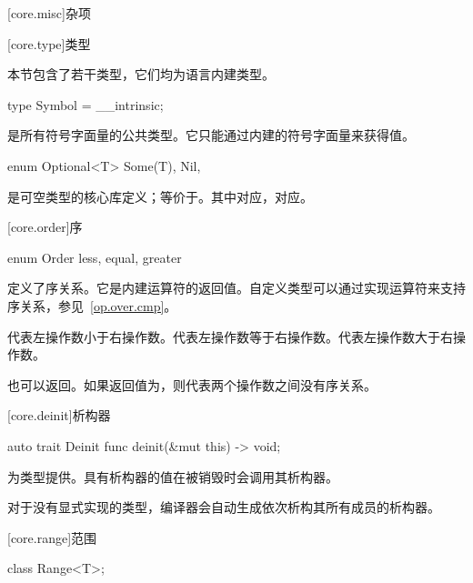 
[core.misc]{杂项}

[core.type]{类型}

\pnum
本节包含了若干类型，它们均为语言内建类型。

\begin{itemdecl}
type Symbol = __intrinsic;
\end{itemdecl}

\pnum
{}是所有符号字面量的公共类型。它只能通过内建的符号字面量来获得值。

\begin{itemdecl}
enum Optional<T> {
    Some(T),
    Nil,
}
\end{itemdecl}

\pnum
{}是可空类型的核心库定义；等价于。其中对应，对应。

[core.order]{序}

\begin{itemdecl}
enum Order {
    less,
    equal,
    greater
}
\end{itemdecl}

\pnum
{}定义了序关系。它是内建运算符的返回值。自定义类型可以通过实现运算符来支持序关系，参见~\ref{op.over.cmp}。

\pnum
{}代表左操作数小于右操作数。代表左操作数等于右操作数。代表左操作数大于右操作数。

\pnum
{}也可以返回。如果返回值为，则代表两个操作数之间没有序关系。

[core.deinit]{析构器}

\begin{itemdecl}
auto trait Deinit {
    func deinit(&mut this) -> void;
}
\end{itemdecl}

\pnum
{}为类型提供。具有析构器的值在被销毁时会调用其析构器。

\pnum
对于没有显式实现的类型，编译器会自动生成依次析构其所有成员的析构器。

[core.range]{范围}

\begin{itemdecl}
class Range<T>;
\end{itemdecl}

